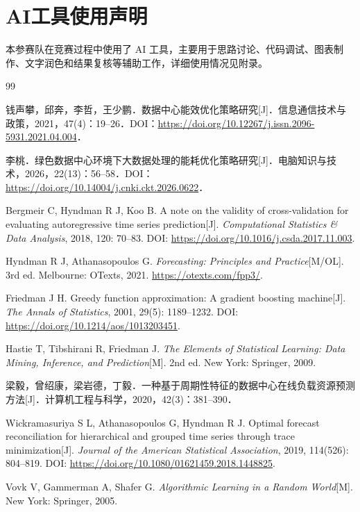 \section*{AI工具使用声明}

本参赛队在竞赛过程中使用了 AI 工具，主要用于思路讨论、代码调试、图表制作、文字润色和结果复核等辅助工作，详细使用情况见附录。

\begin{thebibliography}{99}

钱声攀，邱奔，李哲，王少鹏．数据中心能效优化策略研究[J]．信息通信技术与政策，2021，47(4)：19--26．DOI：\url{https://doi.org/10.12267/j.issn.2096-5931.2021.04.004}．

李桃．绿色数据中心环境下大数据处理的能耗优化策略研究[J]．电脑知识与技术，2026，22(13)：56--58．DOI：\url{https://doi.org/10.14004/j.cnki.ckt.2026.0622}．

Bergmeir C, Hyndman R J, Koo B. A note on the validity of cross-validation for evaluating autoregressive time series prediction[J]. \emph{Computational Statistics \& Data Analysis}, 2018, 120: 70--83. DOI: \url{https://doi.org/10.1016/j.csda.2017.11.003}.

Hyndman R J, Athanasopoulos G. \emph{Forecasting: Principles and Practice}[M/OL]. 3rd ed. Melbourne: OTexts, 2021. \url{https://otexts.com/fpp3/}.

Friedman J H. Greedy function approximation: A gradient boosting machine[J]. \emph{The Annals of Statistics}, 2001, 29(5): 1189--1232. DOI: \url{https://doi.org/10.1214/aos/1013203451}.

Hastie T, Tibshirani R, Friedman J. \emph{The Elements of Statistical Learning: Data Mining, Inference, and Prediction}[M]. 2nd ed. New York: Springer, 2009.

梁毅，曾绍康，梁岩德，丁毅．一种基于周期性特征的数据中心在线负载资源预测方法[J]．计算机工程与科学，2020，42(3)：381--390．

Wickramasuriya S L, Athanasopoulos G, Hyndman R J. Optimal forecast reconciliation for hierarchical and grouped time series through trace minimization[J]. \emph{Journal of the American Statistical Association}, 2019, 114(526): 804--819. DOI: \url{https://doi.org/10.1080/01621459.2018.1448825}.

Vovk V, Gammerman A, Shafer G. \emph{Algorithmic Learning in a Random World}[M]. New York: Springer, 2005.


\end{thebibliography}
